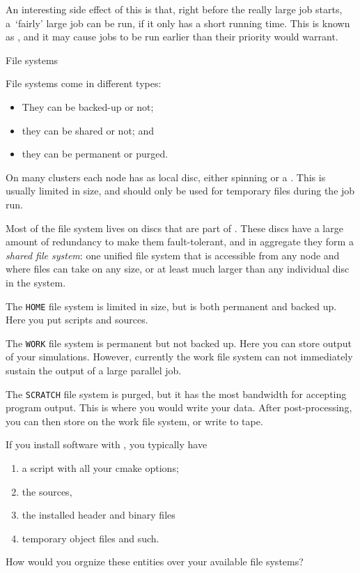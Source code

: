 An interesting side effect of this is that,
right before the really large job starts,
a~`fairly' large job can be run, if it only has a short running time.
This is known as , and it may cause jobs to be
run earlier than their priority would warrant.

 {File systems}

File systems come in different types:
\begin{itemize}
\item They can be backed-up or not;
\item they can be shared or not; and
\item they can be permanent or purged.
\end{itemize}

On many clusters each node has as local disc, either spinning or a
. This is usually limited in size, and
should only be used for temporary files during the job run.

Most of the file system lives on discs that are part of
.
These discs have a large amount of redundancy to make them
fault-tolerant, and in aggregate they form a
\emph{shared file system}:
one unified file system that is accessible from any node
and where files can take on any size, or at least
much larger than any individual disc in the system.

\begin{taccnote}
  The \texttt{HOME} file system is limited in size, but
  is both permanent and backed up. Here you put scripts and sources.

  The \texttt{WORK} file system is permanent but not backed up.
  Here you can store output of your simulations. However, currently
  the work file system can not immediately sustain the output of
  a large parallel job.

  The \texttt{SCRATCH} file system is purged, but it has the most bandwidth
  for accepting program output. This is where you would write your data.
  After post-processing, you can then store on the work file system,
  or write to tape.
\end{taccnote}

\begin{exercise}
  If you install software with , you typically have
  \begin{enumerate}
  \item a script with all your cmake options;
  \item the sources,
  \item the installed header and binary files
  \item temporary object files and such.
  \end{enumerate}
  How would you orgnize these entities over your available file systems?
\end{exercise}

